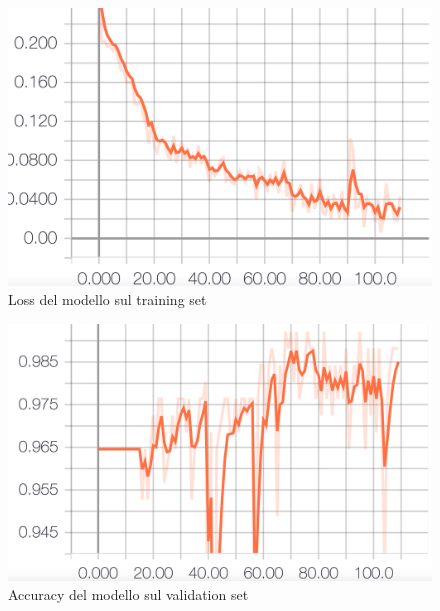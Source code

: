 \documentclass[8pt,notitlepage]{report}
\begin{document}
			\begin{figure}[H]
				\begin{center}
					\includegraphics[scale=.16]{loss_Manuel}
					\caption{Loss del modello sul training set}
				\end{center}
			\end{figure}
			
			\begin{figure}[H]
				\begin{center}
					\includegraphics[scale=.16]{val_acc_Manuel}
					\caption{Accuracy del modello sul validation set}
					\label{fig:acc_val_Manuel}
				\end{center}
			\end{figure}
			
\end{document}
